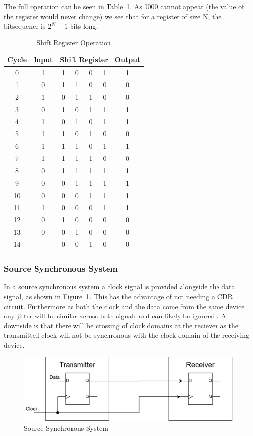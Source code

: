 The full operation can be seen in Table~\ref{tab:shift_reg}. As 0000 cannot
appear (the value of the register would never change) we see that for a register of size N, the
bitsequence is $2^N - 1$ bits long. 
\begin{table}[ht]
    \centering
    \begin{tabular}{|c|c|c c c c|c|}
    \hline
    Cycle & Input & \multicolumn{4}{|c|}{Shift Register} & Output \\
    \hline
     0  & 1 & 1 & 0 & 0 & 1 & 1 \\
     1  & 0 & 1 & 1 & 0 & 0 & 0 \\
     2  & 1 & 0 & 1 & 1 & 0 & 0 \\
     3  & 0 & 1 & 0 & 1 & 1 & 1 \\
     4  & 1 & 0 & 1 & 0 & 1 & 1 \\
     5  & 1 & 1 & 0 & 1 & 0 & 0 \\
     6  & 1 & 1 & 1 & 0 & 1 & 1 \\
     7  & 1 & 1 & 1 & 1 & 0 & 0 \\
     8  & 0 & 1 & 1 & 1 & 1 & 1 \\
     9  & 0 & 0 & 1 & 1 & 1 & 1 \\
     10 & 0 & 0 & 0 & 1 & 1 & 1 \\
     11 & 1 & 0 & 0 & 0 & 1 & 1 \\
     12 & 0 & 1 & 0 & 0 & 0 & 0 \\
     13 & 0 & 0 & 1 & 0 & 0 & 0 \\
     14 &   & 0 & 0 & 1 & 0 & 0 \\
    \hline
    \end{tabular}
    \caption{Shift Register Operation}
    \label{tab:shift_reg}
\end{table}

\subsubsection{Source Synchronous System}%
\label{ssub:source_synchronous_system}
In a source synchronous system a clock signal is provided alongside the data
signal, as shown in Figure~\ref{fig:source_sync}. This has the advantage of not
needing a CDR circuit. Furthermore as both the clock and the data come from the
same device any jitter will be similar across both signals and can likely be
ignored \cite{ragab2011receiver}.   A downside is that there will be crossing
of clock domains at the reciever as the transmitted clock will not be
synchronous with the clock domain of the receiving device.
\begin{figure}[ht]
    \centering
    \includegraphics[width=0.8\linewidth]{img/source_sync.png}
    \caption{Source Synchronous System}%
    \label{fig:source_sync}
\end{figure}

